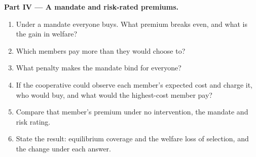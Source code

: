 \begin{problem}
\medskip
\noindent\textbf{Part IV --- A mandate and risk-rated premiums.}
\begin{enumerate}[resume]
  \item Under a mandate everyone buys. What premium breaks even, and what is the gain in welfare?
  \item Which members pay more than they would choose to?
  \item What penalty makes the mandate bind for everyone?
  \item If the cooperative could observe each member's expected cost and charge it, who would buy, and what would the
    highest-cost member pay?
  \item Compare that member's premium under no intervention, the mandate and risk rating.
  \item State the result: equilibrium coverage and the welfare loss of selection, and the change under each answer.
\end{enumerate}
\end{problem}
